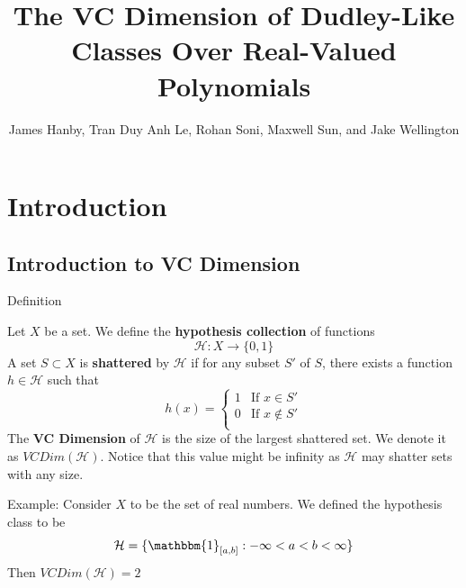 \documentclass[9pt]{beamer}
\title[]{The VC Dimension of Dudley-Like Classes Over Real-Valued Polynomials}
\author[]{James Hanby, Tran Duy Anh Le, Rohan Soni, Maxwell Sun, and Jake Wellington}
\institute{Tripods/Stemforall 2022}
\begin{document}
\nocite{*}
\frame{\titlepage}  %

\section{Introduction}
\subsection{Introduction to VC Dimension}
\begin{frame}{Definition}
\begin{definition}
    Let $X$ be a set. We define the \textbf{hypothesis collection} of functions
    $$\mathcal{H}: X \rightarrow \{0,1 \}$$
    A set $S \subset X$ is \textbf{shattered} by $\mathcal{H}$ if for any subset $S'$ of $S$, there exists a function $h \in \mathcal{H}$ such that
    $$h(x) = \begin{cases}
    1 & \text{If $x \in S'$}\\
    0 & \text{If $x \not \in S'$}\\
    \end{cases}$$
    \pause
    The \textbf{VC Dimension} of $\mathcal{H}$ is the size of the largest shattered set. We denote it as $VCDim(\mathcal{H})$. Notice that this value might be infinity as $\mathcal{H}$ may shatter sets with any size.
\end{definition}
\pause
\begin{example}
Example: Consider $X$ to be the set of real numbers. We defined the hypothesis class to be
$$\mathcal{H} = \{\mathbbm{1}_{[a,b]}: -\infty < a < b < \infty \}$$
Then $VCDim(\mathcal{H}) = 2$
\end{example}
\end{frame}
\end{document}
